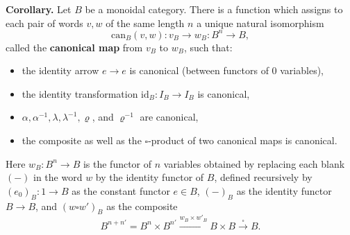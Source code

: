 \textbf{Corollary.} Let $B$ be a monoidal category. There is a function which assigns to each pair of words $v, w$ of the same length $n$ a unique natural isomorphism
$$\mathrm{can}_B(v, w) : v_B \longrightarrow w_B : B^n \longrightarrow B,$$
called the \textbf{canonical map} from $v_B$ to $w_B$, such that:
\begin{itemize}
\item the identity arrow $e \rightarrow e$ is canonical (between functors of $0$ variables),
\item the identity transformation $\mathrm{id}_B : I_B \rightarrow I_B$ is canonical,
\item $\alpha, \alpha^{-1}, \lambda, \lambda^{-1}, \varrho$, and $\varrho^{-1}$ are canonical,
\item the composite as well as the $\square$-product of two canonical maps is canonical.
\end{itemize}
Here $w_B : B^n \rightarrow B$ is the functor of $n$ variables obtained by replacing each blank $(-)$ in the word $w$ by the identity functor of $B$, defined recursively by $(e_0)_B : 1 \rightarrow B$ as the constant functor $e \in B$, $(-)_B$ as the identity functor $B \rightarrow B$, and $(w \square w')_B$ as the composite
$$B^{n+n'} = B^n \times B^{n'} \xrightarrow{w_B \times w'_B} B \times B \xrightarrow{\square} B.$$
